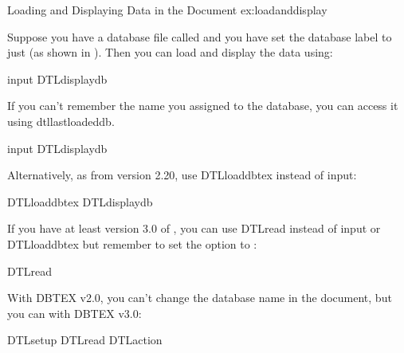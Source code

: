 \begin{example}
 {Loading and Displaying Data in the Document}
 {ex:loadanddisplay}

Suppose you have a database file called 
and you have set the database label to just 
(as shown in ).
Then you can load and display the data using:
\begin{codebox}
\codepar
\gls{input}
\codepar
{}
\gls{DTLdisplaydb}
\end{codebox}

If you can't remember the name you assigned to the database, you can 
access it using \gls{dtllastloadeddb}.
\begin{codebox}
\codepar
\gls{input}
\codepar
{}
\gls{DTLdisplaydb}
\end{codebox}

Alternatively, as from  version 2.20, use 
\gls{DTLloaddbtex} instead of \gls{input}:
\begin{codebox}
\codepar
\gls{DTLloaddbtex}
\codepar
{}
\gls{DTLdisplaydb}
\end{codebox}
If you have at least version 3.0 of , you can use
\gls{DTLread} instead of \gls{input} or \gls{DTLloaddbtex} but remember to set the
 option to :
\begin{codebox}
\gls{DTLread}
\end{codebox}
With DBTEX v2.0, you can't change the database name in the document,
but you can with DBTEX v3.0:
\begin{codebox}
\codepar
\gls{DTLsetup}
\gls{DTLread}
\codepar
{}
\gls{DTLaction}
\end{codebox}
\end{example}

